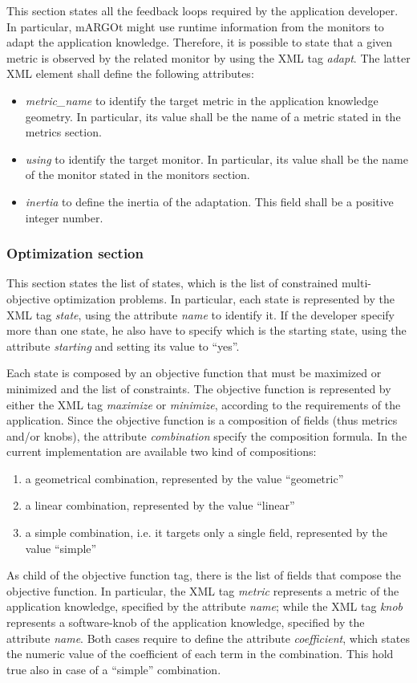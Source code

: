 This section states all the feedback loops required by the application developer.
In particular, mARGOt might use runtime information from the monitors to adapt the application knowledge.
Therefore, it is possible to state that a given metric is observed by the related monitor by using the XML tag \textit{adapt}.
The latter XML element shall define the following attributes:
\begin{itemize}
	\item \textit{metric\_name} to identify the target metric in the application knowledge geometry. In particular, its value shall be the name of a metric stated in the metrics section.
	\item \textit{using} to identify the target monitor. In particular, its value shall be the name of the monitor stated in the monitors section.
	\item \textit{inertia} to define the inertia of the adaptation. This field shall be a positive integer number.
\end{itemize} 




\subsubsection*{Optimization section}

This section states the list of states, which is the list of constrained multi-objective optimization problems.
In particular, each state is represented by the XML tag \textit{state}, using the attribute \textit{name} to identify it.
If the developer specify more than one state, he also have to specify which is the starting state, using the attribute \textit{starting} and setting its value to ``yes''.


Each state is composed by an objective function that must be maximized or minimized and the list of constraints.
The objective function is represented by either the XML tag \textit{maximize} or \textit{minimize}, according to the requirements of the application.
Since the objective function is a composition of fields (thus metrics and/or knobs), the attribute \textit{combination} specify the composition formula.
In the current implementation are available two kind of compositions:
\begin{enumerate}
	\item a geometrical combination, represented by the value ``geometric''
	\item a linear combination, represented by the value ``linear''
	\item a simple combination, i.e. it targets only a single field, represented by the value ``simple''
\end{enumerate}
As child  of the objective function tag, there is the list of fields that compose the objective function.
In particular, the XML tag \textit{metric} represents a metric of the application knowledge, specified by the attribute \textit{name}; while the XML tag \textit{knob} represents a software-knob of the application knowledge, specified by the attribute \textit{name}.
Both cases require to define the attribute \textit{coefficient}, which states the numeric value of the coefficient of each term in the combination.
This hold true also in case of a ``simple'' combination.


